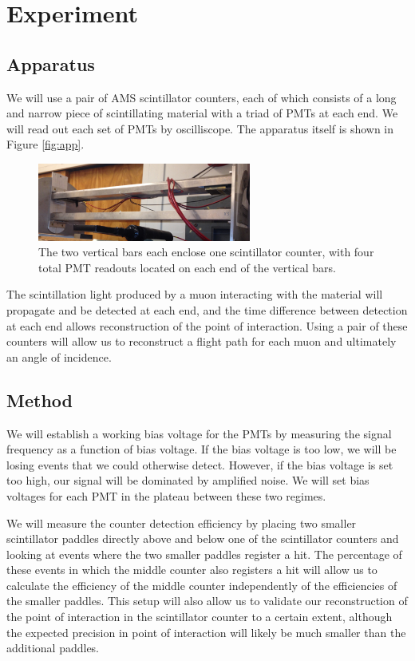 \section{Experiment}

\subsection{Apparatus}

We will use a pair of AMS scintillator counters, each of which consists of a long and narrow piece of scintillating material with a triad of PMTs at each end. We will read out each set of PMTs by oscilliscope. The apparatus itself is shown in Figure \ref{fig:app}.

\begin{figure}[htb]
\includegraphics[width=7cm]{apparatus.JPG}
\caption{The two vertical bars each enclose one scintillator counter, with four total PMT readouts located on each end of the vertical bars.}
\label{fig:apparatus}
\end{figure}

The scintillation light produced by a muon interacting with the material will propagate and be detected at each end, and the time difference between detection at each end allows reconstruction of the point of interaction. Using a pair of these counters will allow us to reconstruct a flight path for each muon and ultimately an angle of incidence.

\subsection{Method}

We will establish a working bias voltage for the PMTs by measuring the signal frequency as a function of bias voltage. If the bias voltage is too low, we will be losing events that we could otherwise detect. However, if the bias voltage is set too high, our signal will be dominated by amplified noise. We will set bias voltages for each PMT in the plateau between these two regimes.

We will measure the counter detection efficiency by placing two smaller scintillator paddles directly above and below one of the scintillator counters and looking at events where the two smaller paddles register a hit. The percentage of these events in which the middle counter also registers a hit will allow us to calculate the efficiency of the middle counter independently of the efficiencies of the smaller paddles. This setup will also allow us to validate our reconstruction of the point of interaction in the scintillator counter to a certain extent, although the expected precision in point of interaction will likely be much smaller than the additional paddles.

